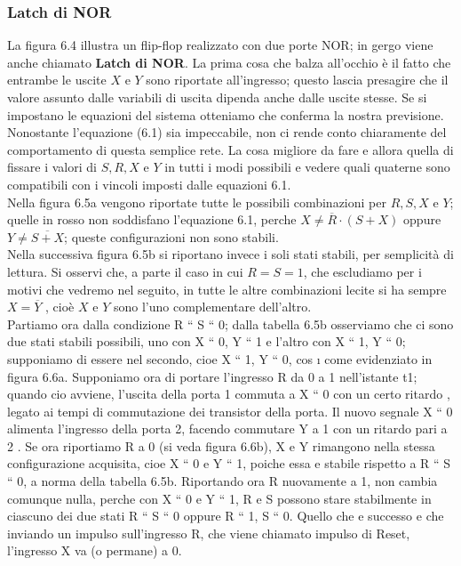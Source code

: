 \documentclass[a4paper]{extarticle}
\begin{document}
\subsubsection{Latch di NOR}
La figura 6.4 illustra un flip-flop realizzato con due porte NOR; in gergo viene anche chiamato \textbf{Latch di NOR}. La prima cosa che balza all’occhio è il fatto che entrambe le uscite \(X\) e \(Y\) sono riportate all'ingresso; questo lascia presagire che il valore assunto dalle variabili di uscita dipenda anche dalle uscite stesse. Se si impostano le equazioni del sistema otteniamo che conferma la nostra previsione. Nonostante l’equazione (6.1) sia impeccabile, non ci rende conto chiaramente
del comportamento di questa semplice rete. La cosa migliore da fare e allora quella di fissare i valori di \(S, R, X\) e \(Y\) in tutti i modi possibili e vedere quali quaterne sono compatibili con i vincoli imposti dalle equazioni 6.1.\\
Nella figura 6.5a vengono riportate tutte le possibili combinazioni per \(R, S, X\) e \(Y\); quelle in rosso non soddisfano l’equazione 6.1, perche \(X \neq \overline{R} \cdot (S + X)\) oppure \(Y \neq \overline{S + X}\); queste configurazioni non sono stabili.\\
Nella successiva figura 6.5b si riportano invece i soli stati stabili, per semplicità di lettura. Si osservi che, a parte il caso in cui \(R = S = 1\), che escludiamo per i motivi che vedremo nel seguito, in tutte le altre combinazioni lecite si ha sempre \(X = \overline{Y}\) , cioè \(X\) e \(Y\) sono l’uno complementare dell'altro.\\
Partiamo ora dalla condizione R “ S “ 0; dalla tabella 6.5b osserviamo che ci sono due stati stabili possibili, uno
con X “ 0, Y “ 1 e l’altro con X “ 1, Y “ 0; supponiamo di essere nel secondo, cioe  X “ 1, Y “ 0, cos ı come
evidenziato in figura 6.6a. Supponiamo ora di portare l’ingresso R da 0 a 1 nell’istante t1; quando cio avviene,
l’uscita della porta 1 commuta a X “ 0 con un certo ritardo   , legato ai tempi di commutazione dei transistor della
porta. Il nuovo segnale X “ 0 alimenta l’ingresso della porta 2, facendo commutare Y a 1 con un ritardo pari a 2  .
Se ora riportiamo R a 0 (si veda figura 6.6b), X e Y rimangono nella stessa configurazione acquisita, cioe  X “ 0
e Y “ 1, poiche essa   e stabile rispetto a   R “ S “ 0, a norma della tabella 6.5b. Riportando ora R nuovamente a
1, non cambia comunque nulla, perche con   X “ 0 e Y “ 1, R e S possono stare stabilmente in ciascuno dei due
stati R “ S “ 0 oppure R “ 1, S “ 0. Quello che e successo   e che inviando un impulso sull’ingresso   R, che
viene chiamato impulso di Reset, l’ingresso X va (o permane) a 0.
\end{document}
